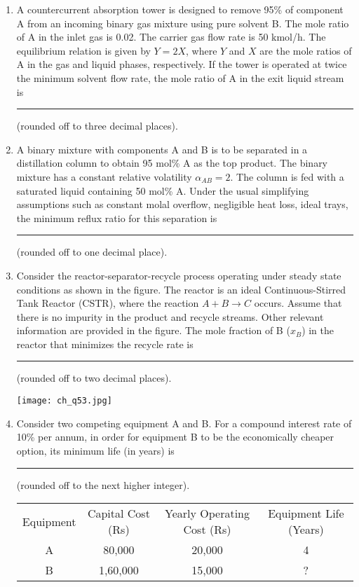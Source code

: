 \documentclass[12pt]{article}
\begin{document}
\begin{enumerate}[label=Q.\arabic*]
		\item A countercurrent absorption tower is designed to remove 95\% of component A from an incoming binary gas mixture using pure solvent B. The mole ratio of A in the inlet gas is 0.02. The carrier gas flow rate is 50 kmol/h. The equilibrium relation is given by $Y = 2X$, where $Y$ and $X$ are the mole ratios of A in the gas and liquid phases, respectively. If the tower is operated at twice the minimum solvent flow rate, the mole ratio of A in the exit liquid stream is \rule{3cm}{0.15mm} (rounded off to three decimal places).

		\item A binary mixture with components A and B is to be separated in a distillation column to obtain 95 mol\% A as the top product. The binary mixture has a constant relative volatility $\alpha_{AB} = 2$. The column is fed with a saturated liquid containing 50 mol\% A. Under the usual simplifying assumptions such as constant molal overflow, negligible heat loss, ideal trays, the minimum reflux ratio for this separation is \rule{3cm}{0.15mm} (rounded off to one decimal place).

		\item Consider the reactor-separator-recycle process operating under steady state conditions as shown in the figure. The reactor is an ideal Continuous-Stirred Tank Reactor (CSTR), where the reaction $A + B \rightarrow C$ occurs. Assume that there is no impurity in the product and recycle streams. Other relevant information are provided in the figure. The mole fraction of B ($x_B$) in the reactor that minimizes the recycle rate is \rule{3cm}{0.15mm} (rounded off to two decimal places).

			\begin{center}{
					\texttt{[image: ch\_q53.jpg]}
			}\end{center}

		\item Consider two competing equipment A and B. For a compound interest rate of 10\% per annum, in order for equipment B to be the economically cheaper option, its minimum life (in years) is \rule{3cm}{0.15mm} (rounded off to the next higher integer).

			\begin{center}
				\begin{tabular}{|c|c|c|c|}
					Equipment & Capital Cost (Rs) & Yearly Operating Cost (Rs) & Equipment Life (Years) \\
					A & 80,000 & 20,000 & 4 \\
					B & 1,60,000 & 15,000 & ? \\
				\end{tabular}
			\end{center}


\end{enumerate}
\end{document}

